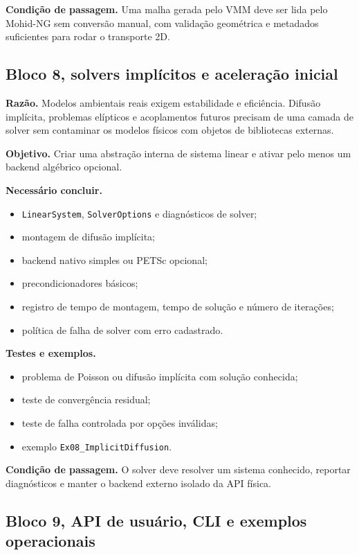 \documentclass[11pt,a4paper]{article}
\begin{document}
\textbf{Condi\c{c}\~ao de passagem.} Uma malha gerada pelo VMM deve ser lida pelo Mohid-NG sem convers\~ao manual, com valida\c{c}\~ao geom\'etrica e metadados suficientes para rodar o transporte 2D.

\subsection*{Bloco 8, solvers impl\'icitos e acelera\c{c}\~ao inicial}

\textbf{Raz\~ao.} Modelos ambientais reais exigem estabilidade e efici\^encia. Difus\~ao impl\'icita, problemas el\'ipticos e acoplamentos futuros precisam de uma camada de solver sem contaminar os modelos f\'isicos com objetos de bibliotecas externas.

\textbf{Objetivo.} Criar uma abstra\c{c}\~ao interna de sistema linear e ativar pelo menos um backend alg\'ebrico opcional.

\textbf{Necess\'ario concluir.}
\begin{itemize}
  \item \texttt{LinearSystem}, \texttt{SolverOptions} e diagn\'osticos de solver;
  \item montagem de difus\~ao impl\'icita;
  \item backend nativo simples ou PETSc opcional;
  \item precondicionadores b\'asicos;
  \item registro de tempo de montagem, tempo de solu\c{c}\~ao e n\'umero de itera\c{c}\~oes;
  \item pol\'itica de falha de solver com erro cadastrado.
\end{itemize}

\textbf{Testes e exemplos.}
\begin{itemize}
  \item problema de Poisson ou difus\~ao impl\'icita com solu\c{c}\~ao conhecida;
  \item teste de converg\^encia residual;
  \item teste de falha controlada por op\c{c}\~oes inv\'alidas;
  \item exemplo \texttt{Ex08\_ImplicitDiffusion}.
\end{itemize}

\textbf{Condi\c{c}\~ao de passagem.} O solver deve resolver um sistema conhecido, reportar diagn\'osticos e manter o backend externo isolado da API f\'isica.

\subsection*{Bloco 9, API de usu\'ario, CLI e exemplos operacionais}
\end{document}
